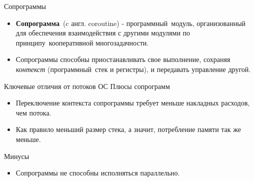 \begin{frame}{Сопрограммы}
	\begin{itemize}
		\item \textbf{Сопрограмма} (c англ. coroutine) - программный модуль, организованный для обеспечения взаимодействия с другими модулями по принципу кооперативной многозадачности.
		
		\item Сопрограммы способны приостанавливать свое выполнение, сохраняя \textit{контекст} 
		(программный стек и регистры), и передавать управление другой.
	\end{itemize}
\end{frame}

\begin{frame}{Ключевые отличия от потоков ОС}
	Плюсы сопрограмм
	\begin{itemize}
		\item Переключение контекста сопрограммы требует меньше накладных расходов, чем потока.
		\item Как правило меньший размер стека, а значит, потребление памяти так же меньше.
	\end{itemize}

	Минусы
	\begin{itemize}
		\item Сопрограммы не способны исполняться параллельно.
	\end{itemize}
\end{frame}


